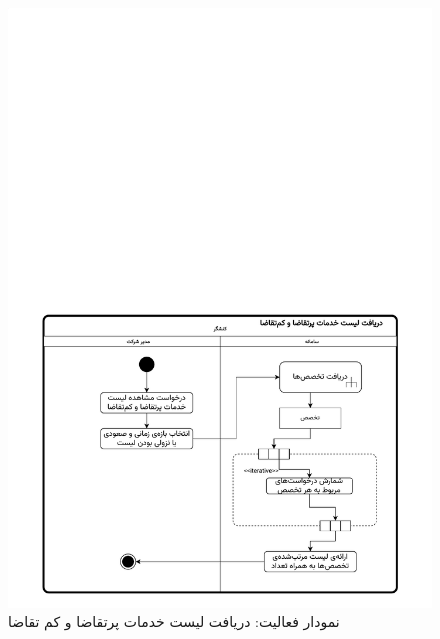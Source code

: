 \begin{figure}[ht!]
	\centering
	\includegraphics[scale=0.8, page=1]{figs/OOD-activity-popular.pdf}
	\caption{نمودار فعالیت: دریافت لیست خدمات پرتقاضا و کم تقاضا}
\end{figure}
\FloatBarrier
\newpage


